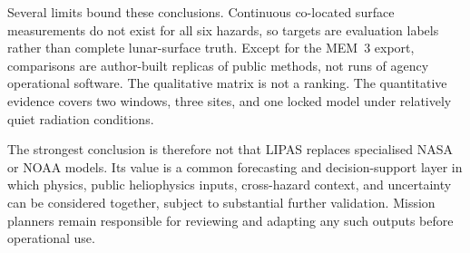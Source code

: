 Several limits bound these conclusions. Continuous co-located surface measurements do not exist for all six hazards, so targets are evaluation labels rather than complete lunar-surface truth. Except for the MEM~3 export, comparisons are author-built replicas of public methods, not runs of agency operational software. The qualitative matrix is not a ranking. The quantitative evidence covers two windows, three sites, and one locked model under relatively quiet radiation conditions.

The strongest conclusion is therefore not that LIPAS replaces specialised NASA or NOAA models. Its value is a common forecasting and decision-support layer in which physics, public heliophysics inputs, cross-hazard context, and uncertainty can be considered together, subject to substantial further validation. Mission planners remain responsible for reviewing and adapting any such outputs before operational use.
